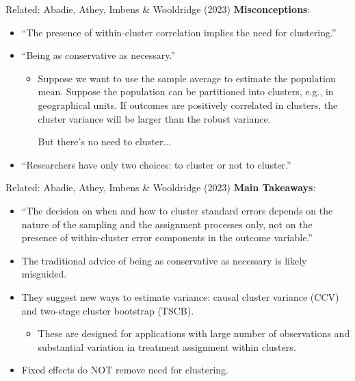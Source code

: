 \begin{frame}{Related: Abadie, Athey, Imbens \& Wooldridge
(2023)}
\textbf{Misconceptions}:
\begin{itemize}
\item ``The presence of within-cluster correlation implies the need for clustering.''
\item ``Being as conservative as necessary.''

\begin{itemize}
    \item Suppose we want to use the sample average to estimate the population mean. Suppose the population can be partitioned into clusters, e.g., in geographical units. If outcomes are positively correlated in clusters, the cluster variance will be larger than the robust variance.

But there's no need to cluster...
\end{itemize}
\item ``Researchers have only two choices: to cluster or not to cluster.''
\end{itemize}

\end{frame}

\begin{frame}{Related: Abadie, Athey, Imbens \& Wooldridge
(2023)}
\textbf{Main Takeaways}:
\begin{itemize}
    \item ``The decision on when and how to cluster standard errors depends on the nature of the sampling and the assignment processes only, not on the presence of within-cluster error components in the outcome variable.''
    \item The traditional advice of being as conservative as necessary is likely misguided.
    \item They suggest new ways to estimate variance: causal cluster variance (CCV) and two-stage cluster bootstrap (TSCB).
    \begin{itemize}
        \item These are designed for applications with large number of observations and substantial variation in treatment assignment within clusters.
    \end{itemize}
    \item Fixed effects do NOT remove need for clustering.
\end{itemize}
\end{frame}

